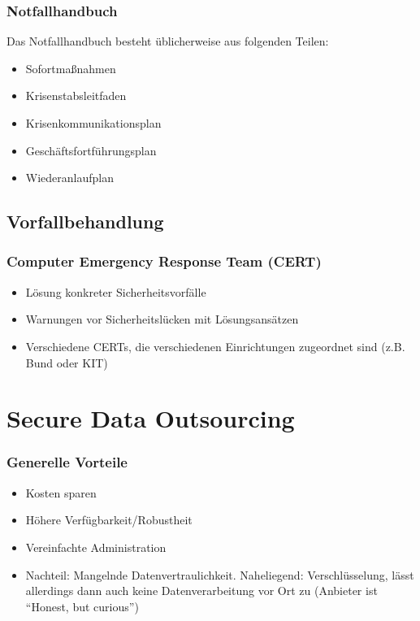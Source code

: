 \subsubsection{Notfallhandbuch}
Das Notfallhandbuch besteht üblicherweise aus folgenden Teilen:
\begin{itemize}
	\item Sofortmaßnahmen
	\item Krisenstabsleitfaden
	\item Krisenkommunikationsplan
	\item Geschäftsfortführungsplan
	\item Wiederanlaufplan
\end{itemize}


\subsection{Vorfallbehandlung}

\subsubsection{Computer Emergency Response Team (CERT)}
\begin{itemize}
	\item Lösung konkreter Sicherheitsvorfälle
	\item Warnungen vor Sicherheitslücken mit Lösungsansätzen
	\item Verschiedene CERTs, die verschiedenen Einrichtungen zugeordnet sind (z.B. Bund oder KIT)
\end{itemize}



\section{Secure Data Outsourcing}

\subsubsection{Generelle Vorteile}
\begin{itemize}
	\item Kosten sparen
	\item Höhere Verfügbarkeit/Robustheit
	\item Vereinfachte Administration
	\item Nachteil: Mangelnde Datenvertraulichkeit. Naheliegend: Verschlüsselung, lässt allerdings dann auch keine Datenverarbeitung vor Ort zu (Anbieter ist "`Honest, but curious"')
\end{itemize}


